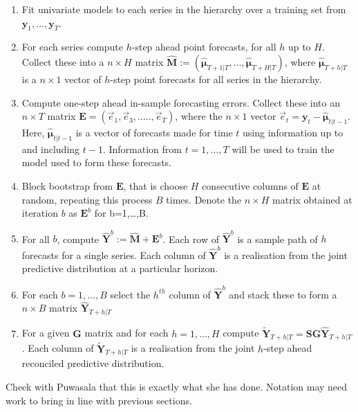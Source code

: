 \documentclass[graybox]{svmult}
\begin{document}
\begin{enumerate}
	\item Fit univariate models to each series in the hierarchy over a training set from ${\bm y}_1,\ldots,{\bm y}_T$.
	\item For each series compute $h$-step ahead point forecasts, for all $h$ up to $H$. Collect these into a $n\times H$ matrix $\hat{\bm M}:=(\hat{\bm{\mu}}_{T+1|T},\ldots,\hat{\bm{\mu}}_{T+H|T})$, where $\hat{\bm{\mu}}_{T+h|T}$ is a $n\times 1$ vector of $h$-step point forecasts for all series in the hierarchy.
	\item Compute one-step ahead in-sample forecasting errors. Collect these into an $n \times T$ matrix ${\bm E}=(\vec{e}_1,\vec{e}_3,.....,\vec{e}_T)$, where the $n\times 1$ vector $\vec{e}_t={\bm y}_t-\hat{\bm {\mu}}_{t|t-1}$.  Here, $\hat{\bm {\mu}}_{t|t-1}$ is a vector of forecasts made for time $t$ using information up to and including $t-1$. Information from $t=1,\dots,T$ will be used to train the model used to form these forecasts.  
	\item Block bootstrap from $\bm{E}$, that is choose $H$ consecutive columns of ${\bm E}$ at random, repeating this process $B$ times.  Denote the $n\times H$ matrix obtained at iteration $b$ as ${\bm E}^b$ for b=1,\ldots,B.  
	\item For all $b$, compute $\hat{\bm Y}^b:=\hat{\bm M}+{\bm E}^b$. Each row of $\hat{\bm Y}^b$ is a sample path of $h$ forecasts for a single series.  Each column of $\hat{\bm Y}^b$ is a realisation from the joint predictive distribution at a particular horizon.
	\item For each $b=1,\ldots,B$ select the $h^{th}$ column of $\hat{\bm Y}^b$ and stack these to form a $n\times B$ matrix $\hat{\bm{Y}}_{T+h|T}$
	\item For a given ${\bm G}$ matrix and for each $h=1,\ldots,H$ compute $\tilde{\bm{Y}}_{T+h|T}={\bm S}{\bm G}\hat{\bm{Y}}_{T+h|T}$.   Each column of $\tilde{\bm Y}_{T+h|T}$ is a realisation from the joint $h$-step ahead reconciled predictive distribution.
\end{enumerate}


{\color{red}Check with Puwasala that this is exactly what she has done.  Notation may need work to bring in line with previous sections.}

\end{document}
